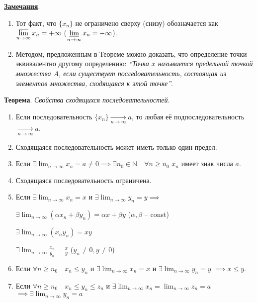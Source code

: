 \documentclass{article}
\newcommand{\parspace}{\vspace{10pt}}
\begin{document}
\parspace

\underline{\textbf{Замечания}}.
\begin{enumerate}
    \item Тот факт, что $\{x_n\}$ не ограничено сверху (снизу) обозначается как 
    $\displaystyle\varlimsup_{n \to \infty} x_n = +\infty$ 
    ($\displaystyle\varliminf_{n \to \infty} x_n = -\infty$).

    \item Методом, предложенным в Теореме можно доказать, что определение точки
    эквивалентно другому определению: \textit{``Точка $x$ называется предельной точкой
    множества $A$, если существует последовательность, состоящая из элементов
    множества, сходящаяся к этой точке''}.
\end{enumerate}

\parspace

\textbf{Теорема}. \textit{Свойства сходящихся последовательностей}.

\begin{enumerate}
    \item Если последовательность $\{x_n\} \underset{n \to \infty}{\to} a$,
    то любая её подпоследовательность $\underset{n \to \infty}{\to} a$.

    \item Сходящаяся последовательность может иметь только один предел.
    \item Если $\exists \displaystyle\lim_{n \to \infty} x_n = a \ne 0 \implies
    \exists n_0 \in \mathbb{N} \quad \forall n \ge n_0$ $x_n$ имеет знак числа $a$.

    \item Сходящаяся последовательность ограничена.
    \item Если $\exists \displaystyle\lim_{n \to \infty} x_n = x$ и
    $\exists \displaystyle\lim_{n \to \infty} y_n = y \implies$

    $\exists \displaystyle\lim_{n \to \infty} (\alpha x_n + \beta y_n) = \alpha x + \beta y$
    ($\alpha, \beta$ -- const)

    $\exists \displaystyle\lim_{n \to \infty} (x_n y_n) = x y$

    $\exists \displaystyle\lim_{n \to \infty} \frac{x_n}{y_n} = \frac{x}{y}$
    ($y_n \ne 0, y \ne 0$)

    \item Если $\forall n \ge n_0 \quad x_n \le y_n$ и 
    $\exists \displaystyle\lim_{n \to \infty} x_n = x$ и
    $\exists \displaystyle\lim_{n \to \infty} y_n = y$ $\implies x \le y$.

    \item Если $\forall n \ge n_0 \quad x_n \le y_n \le z_n$ и
    $\exists \displaystyle\lim_{n \to \infty} x_n = 
    \displaystyle\lim_{n \to \infty} z_n = a$
    $\implies \exists \displaystyle\lim_{n \to \infty} y_n = a$
\end{enumerate}
\end{document}

